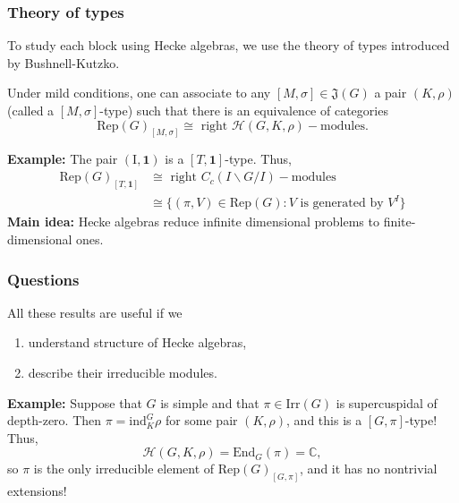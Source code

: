 \documentclass{beamer}
\newcommand{\Rep}{\mathrm{Rep}}
\newcommand{\Irr}{\mathrm{Irr}}
\newcommand{\End}{\mathrm{End}}
\newcommand{\ind}{\mathrm{ind}}
\newcommand{\CC}{\mathbb{C}}
\newcommand{\cH}{\mathcal{H}}
\theoremstyle{plain}
\begin{document}
\begin{frame}
    \frametitle{Theory of types}
    To study each block using Hecke algebras, we use the theory of types introduced by Bushnell-Kutzko.\pause

    \begin{theorem}
        Under mild conditions, one can associate to any $[M,\sigma]\in\mathfrak{J}(G)$ a pair $(K,\rho)$ (called a $[M,\sigma]$-type) such that there is an equivalence of categories
        \[ \Rep(G)_{[M,\sigma]}\cong\text{ right }\cH(G,K,\rho)-\text{modules}.\]
    \end{theorem}\pause

    \textbf{Example:} The pair $(\text{I},\mathbf{1})$ is a $[T,\mathbf{1}]$-type. \pause
    Thus, 
    \begin{align*}
        \Rep(G)_{[T,\mathbf{1}]}&\cong\text{ right }C_c(I\backslash G/I)-\text{modules}\\ 
        &\cong\{(\pi,V)\in\Rep(G):V\text{ is generated by }V^I\}
    \end{align*}\pause
    \textbf{Main idea:} Hecke algebras reduce infinite dimensional problems to finite-dimensional ones.
   
\end{frame}

\iffalse
\begin{frame}
    \frametitle{Examples}
    \textbf{Example:} $\cH(G,K,\mathbf{1})\cong C_c(K\backslash G/K)$ with the convolution product. There is a bijection
    \[\{(\pi,V)\in\Irr(G):V^K\neq 0\}\longleftrightarrow \text{ irreducible }C_c(K\backslash G/K) \text{-mod.}\]
    \vspace{0.5cm}
\end{frame}
\fi

\begin{frame}
    \frametitle{Questions}
    All these results are useful if we \pause
    \begin{enumerate}
        \item understand structure of Hecke algebras, \pause
        \item describe their irreducible modules. \pause
    \end{enumerate}
    \vspace{0.5cm}
    \textbf{Example:} Suppose that $G$ is simple and that $\pi\in\Irr(G)$ is supercuspidal of depth-zero. \pause
    Then $\pi=\ind_K^G\rho$ for some pair $(K,\rho)$, and this is a $[G,\pi]$-type! \pause
    Thus,
    \[\cH(G,K,\rho)=\End_G(\pi)=\CC,\]\pause
    so $\pi$ is the only irreducible element of $\Rep(G)_{[G,\pi]}$, and it has no nontrivial extensions!
\end{frame}
\end{document}
